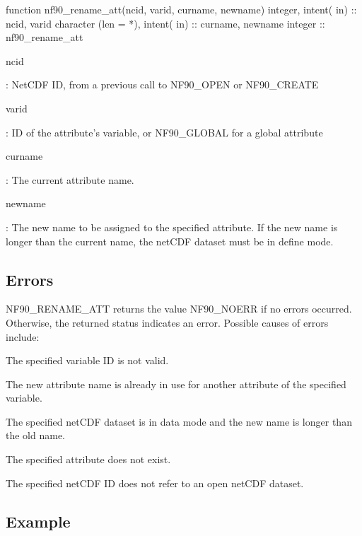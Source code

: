 \begin{DoxyCode}
\textcolor{keyword}{function }nf90\_rename\_att(ncid, varid, curname, newname)
  \textcolor{keywordtype}{integer},             \textcolor{keywordtype}{intent( in)} :: ncid,  varid
  \textcolor{keywordtype}{character (len = *)}, \textcolor{keywordtype}{intent( in)} :: curname, newname
  \textcolor{keywordtype}{integer}                          :: nf90\_rename\_att
\end{DoxyCode}


{\ttfamily ncid}

\+: Net\+C\+DF ID, from a previous call to N\+F90\+\_\+\+O\+P\+EN or N\+F90\+\_\+\+C\+R\+E\+A\+TE

{\ttfamily varid}

\+: ID of the attribute’s variable, or N\+F90\+\_\+\+G\+L\+O\+B\+AL for a global attribute

{\ttfamily curname}

\+: The current attribute name.

{\ttfamily newname}

\+: The new name to be assigned to the specified attribute. If the new name is longer than the current name, the net\+C\+DF dataset must be in define mode.

\subsection*{Errors}

N\+F90\+\_\+\+R\+E\+N\+A\+M\+E\+\_\+\+A\+TT returns the value N\+F90\+\_\+\+N\+O\+E\+RR if no errors occurred. Otherwise, the returned status indicates an error. Possible causes of errors include\+:


\begin{DoxyItemize}
\item The specified variable ID is not valid.
\item The new attribute name is already in use for another attribute of the specified variable.
\item The specified net\+C\+DF dataset is in data mode and the new name is longer than the old name.
\item The specified attribute does not exist.
\item The specified net\+C\+DF ID does not refer to an open net\+C\+DF dataset.
\end{DoxyItemize}

\subsection*{Example}

